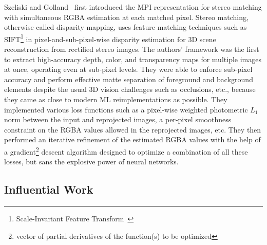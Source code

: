 Szeliski and Golland~\cite{szeliski_stereo_1999} first introduced the MPI representation for stereo matching with simultaneous RGBA estimation at each matched pixel. Stereo matching, otherwise called disparity mapping, uses feature matching techniques such as SIFT\footnote{Scale-Invariant Feature Transform~\cite{lowe_distinctive_2004}} in pixel-and-sub-pixel-wise disparity estimation for 3D scene reconstruction from rectified stereo images. The authors' framework was the first to extract high-accuracy depth, color, and transparency maps for multiple images at once, operating even at sub-pixel levels. They were able to enforce sub-pixel accuracy and perform effective matte separation of foreground and background elements despite the usual 3D vision challenges such as occlusions, etc., because they came as close to modern ML reimplementations as possible. They implemented various loss functions such as a pixel-wise weighted photometric $L_1$ norm between the input and reprojected images, a per-pixel smoothness constraint on the RGBA values allowed in the reprojected images, etc. They then performed an iterative refinement of the estimated RGBA values with the help of a gradient\footnote{vector of partial derivatives of the function(s) to be optimized} descent algorithm designed to optimize a combination of all these losses, but sans the explosive power of neural networks.

\subsection{Influential Work}\label{subsec:influential-work}

